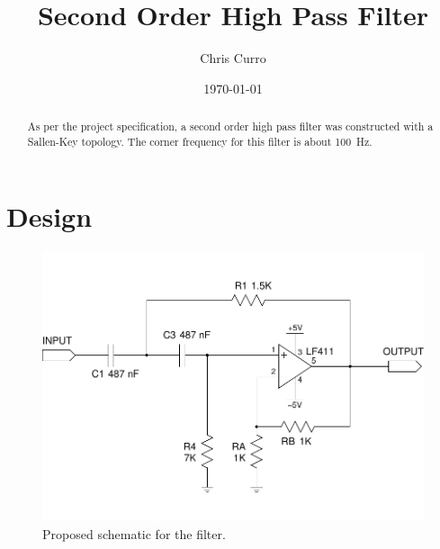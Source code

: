 \documentclass[justified]{tufte-handout}
\title{Second Order High Pass Filter}
\author{Chris Curro}
\date{\today}
\begin{document}
\maketitle
\begin{abstract}
As per the project specification, a second order high pass filter was
constructed with a Sallen-Key topology. The corner frequency for this filter is
about 100~Hz.
\end{abstract}
\section{Design}
\vspace{-0.2in}
\begin{figure}[h]
\centering
\label{schemSim}
\includegraphics[width=0.9\linewidth,trim=0 .3in 0 .35in,clip=true]{schemSim.pdf}
\caption{Proposed schematic for the filter.}
\end{figure}
\end{document}
